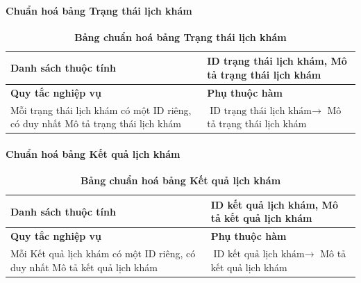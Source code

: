\paragraph{Chuẩn hoá bảng Trạng thái lịch khám}
\mbox{}
\begin{table}[H]
	\caption{\bfseries \fontsize{12pt}{0pt}\selectfont Bảng chuẩn hoá bảng Trạng thái lịch khám}
	\centering
	\begin{tabularx}{0.9\textwidth}{|X|X|}
		\hline
		\textbf{Danh sách thuộc tính} & ID trạng thái lịch khám, Mô tả trạng thái lịch khám                                             \\
		\hline
		\textbf{Quy tắc nghiệp vụ}    & \textbf{Phụ thuộc hàm}                                                                          \\
		\hline
		Mỗi trạng thái lịch khám có một ID riêng, có duy nhất Mô tả trạng thái lịch khám
		                              & \parbox[t]{\linewidth}{$\text{ID trạng thái lịch khám} \rightarrow$ Mô tả trạng thái lịch khám} \\
		\hline
		                                         \\
		                                                   \\
		\hline
	\end{tabularx}
\end{table}

\cleardoublepage

\paragraph{Chuẩn hoá bảng Kết quả lịch khám}
\mbox{}
\begin{table}[H]
	\caption{\bfseries \fontsize{12pt}{0pt}\selectfont Bảng chuẩn hoá bảng Kết quả lịch khám}
	\centering
	\begin{tabularx}{0.9\textwidth}{|X|X|}
		\hline
		\textbf{Danh sách thuộc tính} & ID kết quả lịch khám, Mô tả kết quả lịch khám                                             \\
		\hline
		\textbf{Quy tắc nghiệp vụ}    & \textbf{Phụ thuộc hàm}                                                                    \\
		\hline
		Mỗi Kết quả lịch khám có một ID riêng, có duy nhất Mô tả kết quả lịch khám
		                              & \parbox[t]{\linewidth}{$\text{ID kết quả lịch khám} \rightarrow$ Mô tả kết quả lịch khám} \\
		\hline
		                                      \\
		                                                \\
		\hline
	\end{tabularx}
\end{table}

